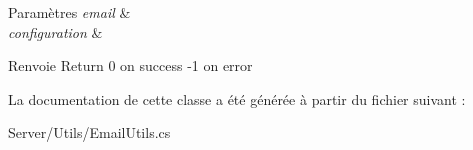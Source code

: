 \begin{DoxyParams}{Paramètres}
{\em email} & \\
\hline
{\em configuration} & \\
\hline
\end{DoxyParams}
\begin{DoxyReturn}{Renvoie}
Return 0 on success -\/1 on error
\end{DoxyReturn}


La documentation de cette classe a été générée à partir du fichier suivant \+:\begin{DoxyCompactItemize}
\item 
Server/\+Utils/Email\+Utils.\+cs\end{DoxyCompactItemize}
